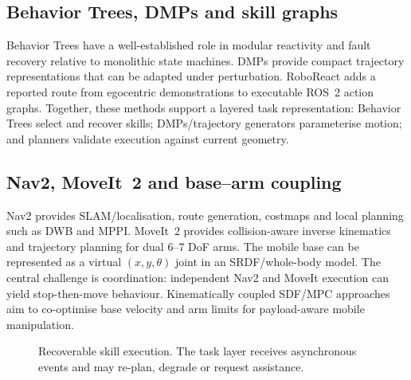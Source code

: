 \documentclass[10pt,a4paper]{article}
\begin{document}
\subsection{Behavior Trees, DMPs and skill graphs}
Behavior Trees have a well-established role in modular reactivity and fault recovery relative to monolithic state machines.\cite{iovino} DMPs provide compact trajectory representations that can be adapted under perturbation.\cite{saveriano} RoboReact adds a reported route from egocentric demonstrations to executable ROS~2 action graphs.\cite{roboreact} Together, these methods support a layered task representation: Behavior Trees select and recover skills; DMPs/trajectory generators parameterise motion; and planners validate execution against current geometry.

\subsection{Nav2, MoveIt~2 and base--arm coupling}
Nav2 provides SLAM/localisation, route generation, costmaps and local planning such as DWB and MPPI. MoveIt~2 provides collision-aware inverse kinematics and trajectory planning for dual 6--7 DoF arms. The mobile base can be represented as a virtual $(x,y,\theta)$ joint in an SRDF/whole-body model. The central challenge is coordination: independent Nav2 and MoveIt execution can yield stop-then-move behaviour. Kinematically coupled SDF/MPC approaches aim to co-optimise base velocity and arm limits for payload-aware mobile manipulation.\cite{liwb,bonci}

\begin{figure}[ht]
\centering
{}
\caption{Recoverable skill execution. The task layer receives asynchronous events and may re-plan, degrade or request assistance.}
\label{fig:skills}
\end{figure}
\end{document}
